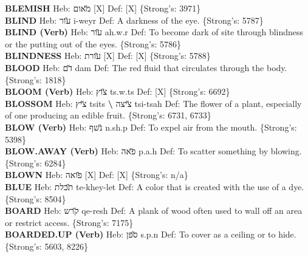 {\textbf{BLEMISH} Heb: {\large\H מאום} {[}X{]} Def: {[}X{]} \{Strong's: 3971\}\hfill{}\\

\textbf{BLIND} Heb: {\large\H עור} i-weyr Def: A darkness of the eye. \{Strong's: 5787\}\hfill{}\\

\textbf{BLIND (Verb)} Heb: {\large\H עור} ah.w.r Def: To become dark of site through blindness or the putting out of the eyes. \{Strong's: 5786\}\hfill{}\\

\textbf{BLINDNESS} Heb: {\large\H עורת} {[}X{]} Def: {[}X{]} \{Strong's: 5788\}\hfill{}\\

\textbf{BLOOD} Heb: {\large\H דם} dam Def: The red fluid that circulates through the body. \{Strong's: 1818\}\hfill{}\\

\textbf{BLOOM (Verb)} Heb: {\large\H צוץ} ts.w.ts Def: {[}X{]} \{Strong's: 6692\}\hfill{}\\

\textbf{BLOSSOM} Heb: {\large\H ציץ} tsits \textbf{\textbackslash{}} {\large\H ציצה} tsi-tsah Def: The flower of a plant, especially of one producing an edible fruit. \{Strong's: 6731, 6733\}\hfill{}\\

\textbf{BLOW (Verb)} Heb: {\large\H נשף} n.sh.p Def: To expel air from the mouth. \{Strong's: 5398\}\hfill{}\\

\textbf{BLOW.AWAY (Verb)} Heb: {\large\H פאה} p.a.h Def: To scatter something by blowing. \{Strong's: 6284\}\hfill{}\\

\textbf{BLOWN} Heb: {\large\H פואה} {[}X{]} Def: {[}X{]} \{Strong's: n/a\}\hfill{}\\

\textbf{BLUE} Heb: {\large\H תכלת} te-khey-let Def: A color that is created with the use of a dye. \{Strong's: 8504\}\hfill{}\\

\textbf{BOARD} Heb: {\large\H קרש} qe-resh Def: A plank of wood often used to wall off an area or restrict access. \{Strong's: 7175\}\hfill{}\\

\textbf{BOARDED.UP (Verb)} Heb: {\large\H ספן} s.p.n Def: To cover as a ceiling or to hide. \{Strong's: 5603, 8226\}\hfill{}\\

}
